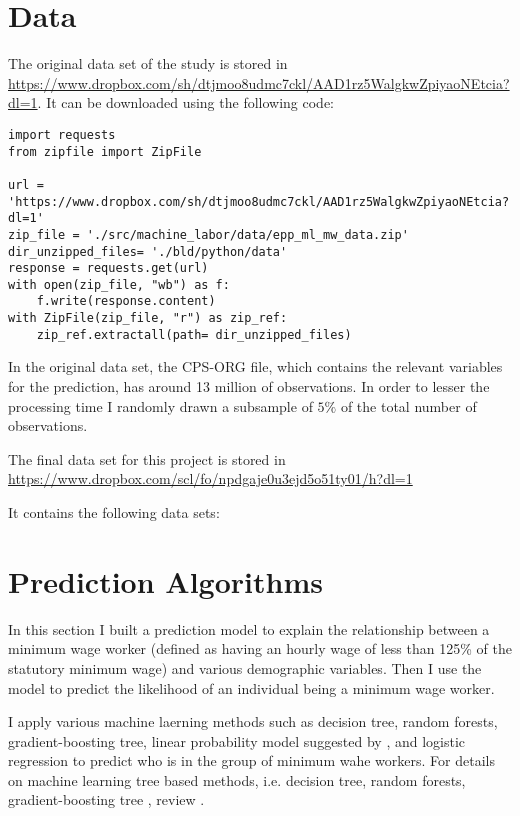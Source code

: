 \documentclass[11pt, a4paper, leqno]{article}
\begin{document}
\section{Data} %
\label{sec:data}

The original data set of the study is stored in \url{https://www.dropbox.com/sh/dtjmoo8udmc7ckl/AAD1rz5WalgkwZpiyaoNEtcia?dl=1}. It can be downloaded using the following code:

\lstset{language=Python}
\lstset{frame=lines}
\begin{lstlisting}
import requests
from zipfile import ZipFile

url = 'https://www.dropbox.com/sh/dtjmoo8udmc7ckl/AAD1rz5WalgkwZpiyaoNEtcia?dl=1'
zip_file = './src/machine_labor/data/epp_ml_mw_data.zip'
dir_unzipped_files= './bld/python/data'
response = requests.get(url)
with open(zip_file, "wb") as f:
    f.write(response.content)
with ZipFile(zip_file, "r") as zip_ref:
    zip_ref.extractall(path= dir_unzipped_files)
\end{lstlisting}

In the original data set, the CPS-ORG file, which contains the relevant variables for the prediction, 
has around 13 million of observations. In order to lesser the processing time I randomly drawn a 
subsample of $5\%$ of the total number of observations.

The final data set for this project is stored in \url{https://www.dropbox.com/scl/fo/npdgaje0u3ejd5o51ty01/h?dl=1}

It contains the following data sets:

\section{Prediction Algorithms}
\label{sec: algorithms}

In this section I built a prediction model to explain the relationship between a minimum wage worker 
(defined as having an hourly wage of less than 125\% of the statutory minimum wage) and various
demographic variables. Then I use the model to predict the likelihood of an individual being a 
minimum wage worker.

I apply various machine laerning methods such as decision tree, random forests, gradient-boosting tree, 
linear probability model suggested by \citet{card2016myth}, and logistic regression to predict who is in the 
group of minimum wahe workers. 
For details on machine learning tree based methods, i.e. decision tree, random forests, gradient-boosting tree , review \citet{hastie2009elements}.
\end{document}
